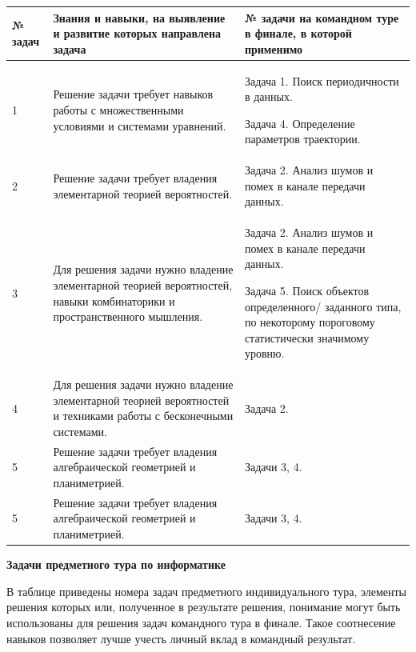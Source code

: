 \begin{center}
\small
\begin{longtable}{|p{2cm}|p{7cm}|p{6cm}|}
\hline
\textbf{№ задач} & \textbf{ Знания и навыки, на выявление и развитие которых направлена задача} & \textbf{№ задачи на командном туре в финале, в которой применимо} \\
\hline
1& Решение задачи требует навыков работы с множественными условиями и системами уравнений.& Задача 1. Поиск периодичности в данных.

Задача 4. Определение параметров траектории. \\
\hline
2 & Решение задачи требует владения элементарной теорией вероятностей. & Задача 2. Анализ шумов и помех в канале передачи данных. \\
\hline
3 & Для решения задачи нужно владение элементарной теорией вероятностей, навыки комбинаторики и пространственного мышления.& Задача 2. Анализ шумов и помех в канале передачи данных.

Задача 5. Поиск объектов определенного/ заданного типа, по некоторому пороговому статистически значимому уровню.\\
\hline
4& Для решения задачи нужно владение элементарной теорией вероятностей и техниками работы с бесконечными системами.& Задача 2.\\
\hline
5& Решение задачи требует владения алгебраической геометрией и планиметрией.& Задачи 3, 4.\\
\hline
5& Решение задачи требует владения алгебраической геометрией и планиметрией.& Задачи 3, 4.\\
\hline
\end{longtable}
\end{center}

\textbf{Задачи предметного тура по информатике}

В таблице приведены номера задач предметного индивидуального тура, элементы решения которых или, полученное в результате решения, понимание могут быть использованы для решения задач командного тура в финале. Такое соотнесение навыков позволяет лучше учесть личный вклад в командный результат.

